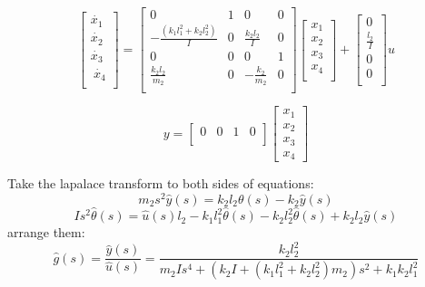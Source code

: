 \documentclass{article}
\begin{document}
\begin{equation*}       %
    \left[                %
    \begin{array}{c}   %
    \dot{x_1} \\  %
    \dot{x_2} \\  %
    \dot{x_3} \\\
    \dot{x_4} \\
    \end{array}
    \right]=      %
    \left[                %
    \begin{array}{cccc}   %
    0 & 1 & 0 & 0\\
    -\frac{(k_1l_1^2+k_2l_2^2)}{I} & 0 & \frac{k_2l_2}{I} & 0\\
    0 & 0 & 0 & 1\\
    \frac{k_2l_2}{m_2} & 0 & -\frac{k_2}{m_2} & 0\\    
    \end{array}
    \right]
    \left[                %
    \begin{array}{c}   %
    x_1 \\  %
    x_2 \\  %
    x_3 \\
    x_4 \\
    \end{array}
    \right]+
    \left[                %
    \begin{array}{c}   %
    0\\
    \frac{l_2}{I}\\
    0\\
    0\\
    \end{array}
    \right]u               
\end{equation*}

\begin{equation*}
    y=\left[
    \begin{array}{cccc}
    0 & 0 & 1 & 0\\
    \end{array}
    \right]
    \left[
    \begin{array}{c}
    x_1 \\  %
    x_2 \\  %
    x_3 \\
    x_4
    \end{array}
    \right]
    \end{equation*}


Take the lapalace transform to both sides of equations:
\[m_2s^2\hat{y}(s)=k_2l_2\theta(s)-k_2\hat{y}(s)\]
\[Is^2\hat{\theta}(s)=\hat{u}(s)l_2-k_1l_1^2\hat{\theta}(s)-k_2l_2^2\hat{\theta}(s)+k_2l_2\hat{y}(s)\]
arrange them:
\[\hat{g}(s)=\frac{\hat{y}(s)}{\hat{u}(s)}=\frac{k_2l_2^2}{m_2Is^4+(k_2I+(k_1l_1^2+k_2l_2^2)m_2)s^2+k_1k_2l_1^2}\]
\end{document}
